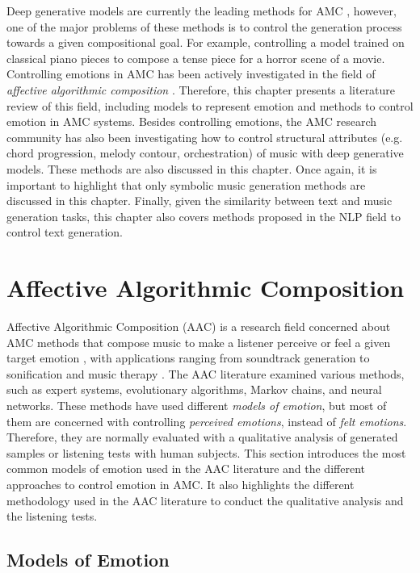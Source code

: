 Deep generative models are currently the leading methods for AMC \cite{}, however, one of the major problems of these methods is to control the generation process towards a given compositional goal. For example, controlling a model trained on classical piano pieces to compose a tense piece for a horror scene of a movie. Controlling emotions in AMC has been actively investigated in the field of \textit{affective algorithmic composition} \cite{williams2015investigating}. Therefore, this chapter presents a literature review of this field, including models to represent emotion and methods to control emotion in AMC systems. Besides controlling emotions, the AMC research community has also been investigating how to control structural attributes (e.g. chord progression, melody contour, orchestration) of music with deep generative models. These methods are also discussed in this chapter. Once again, it is important to highlight that only symbolic music generation methods are discussed in this chapter. Finally, given the similarity between text and music generation tasks, this chapter also covers methods proposed in the NLP field to control text generation.

\section{Affective Algorithmic Composition}

Affective Algorithmic Composition (AAC) is a research field concerned about AMC methods that compose music to make a listener perceive or feel a given target emotion \cite{williams2015investigating}, with applications ranging from soundtrack generation \cite{williams2015dynamic} to sonification \cite{Chen2015} and music therapy \cite{miranda2011brain}. The AAC literature examined various methods, such as expert systems, evolutionary algorithms, Markov chains, and neural networks. These methods have used different \textit{models of emotion}, but most of them are concerned with controlling \textit{perceived emotions}, instead of \textit{felt emotions}. Therefore, they are normally evaluated with a qualitative analysis of generated samples or listening tests with human subjects. This section introduces the most common models of emotion used in the AAC literature and the different approaches to control emotion in AMC. It also highlights the different methodology used in the AAC literature to conduct the qualitative analysis and the listening tests.

\subsection{Models of Emotion}

